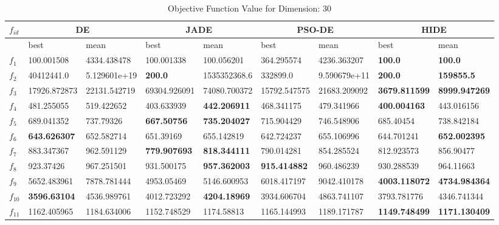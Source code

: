 \begin{table*}[t!]
\centering
\caption{Objective Function Value for Dimension: 30}
\vspace{-3mm}
 \begin{tabular}{|p{0.8cm}|p{1.6cm}|p{1.6cm}|p{1.6cm}|p{1.6cm}|p{1.6cm}|p{1.6cm}|p{1.6cm}|p{1.6cm}|} 
 \hline
$f_{id}$ & \multicolumn{2}{c|}{DE} & \multicolumn{2}{c|}{JADE} & \multicolumn{2}{c|}{PSO-DE} & \multicolumn{2}{c|}{HIDE} \\
 \hline
    & best & mean & best & mean & best & mean & best & mean \\ [0.5ex] 
 \hline
$f_{1}$ & 100.001508 & 4334.438478 & 100.001338 & 100.056201 & 364.295574 & 4236.363207 & \textbf{100.0} & \textbf{100.0} \\ 
$f_{2}$  & 40412441.0 & 5.129601e+19 & \textbf{200.0} & 1535352368.6 & 332899.0 & 9.590679e+11 & \textbf{200.0} & \textbf{159855.5} \\ 
$f_{3}$  & 17926.872873 & 22131.542719 & 69304.926091 & 74080.700372 & 15792.547575 & 21683.209092 & \textbf{3679.811599} & \textbf{8999.947269} \\ 
$f_{4}$  & 481.255055 & 519.422652 & 403.633939 & \textbf{442.206911} & 468.341175 & 479.341966 & \textbf{400.004163} & 443.016156 \\ 
$f_{5}$  & 689.041352 & 737.79326 & \textbf{667.50756} & \textbf{735.204027} & 715.904429 & 746.548906 & 685.40454 & 738.842184 \\ 
$f_{6}$  & \textbf{643.626307} & 652.582714 & 651.39169 & 655.142819 & 642.724237 & 655.106996 & 644.701241 & \textbf{652.002395} \\ 
$f_{7}$  & 883.347367 & 962.591129 & \textbf{779.907693} & \textbf{818.344111} & 790.014281 & 854.285524 & 812.923573 & 856.90477 \\ 
$f_{8}$  & 923.37426 & 967.251501 & 931.500175 & \textbf{957.362003} & \textbf{915.414882} & 960.486239 & 930.288539 & 964.11663 \\ 
$f_{9}$  & 5652.483961 & 7878.781444 & 4953.05469 & 5146.600953 & 6018.417197 & 9042.410178 & \textbf{4003.118072} & \textbf{4734.984364} \\ 
$f_{10}$  & \textbf{3596.63104} & 4536.989761 & 4012.723292 & \textbf{4204.18969} & 3934.606704 & 4863.741107 & 3793.781776 & 4346.741344 \\ 
$f_{11}$  & 1162.405965 & 1184.634006 & 1152.748529 & 1174.58813 & 1165.144993 & 1189.171787 & \textbf{1149.748499} & \textbf{1171.130409} \\ 

\end{tabular}
\end{table*}
